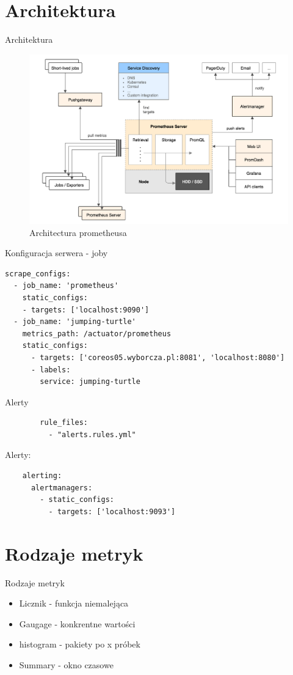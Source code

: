 \documentclass[epic,eepic,aspectratio=169,12pt]{beamer}
\begin{document}
\section{Architektura}
\begin{frame}{Architektura}
		\begin{figure}
			\centering
			\includegraphics[width=0.55\linewidth]{architecture}
			\caption{Architectura prometheusa}
			\label{fig:architecture}
		\end{figure}
\end{frame}
\begin{frame}[fragile]{Konfiguracja serwera - joby}
	\begin{verbatim}
scrape_configs:		
  - job_name: 'prometheus'
    static_configs:
    - targets: ['localhost:9090']		
  - job_name: 'jumping-turtle'
    metrics_path: /actuator/prometheus
    static_configs:
      - targets: ['coreos05.wyborcza.pl:8081', 'localhost:8080']
	  - labels:
        service: jumping-turtle
	\end{verbatim}
\end{frame}
\begin{frame}[fragile]{Alerty}
	\begin{verbatim}
		rule_files:
		  - "alerts.rules.yml"		  
	\end{verbatim}
	Alerty:
	\begin{verbatim}
	alerting:
	  alertmanagers:
	    - static_configs:
	      - targets: ['localhost:9093']
	\end{verbatim}
\end{frame}
\section{Rodzaje metryk}
\begin{frame}{Rodzaje metryk}
	\begin{itemize}
		\item Licznik - funkcja niemalejąca
		\item Gaugage - konkrentne wartości
		\item histogram - pakiety po x próbek
		\item Summary - okno czasowe
	\end{itemize}
\end{frame}
\end{document}
